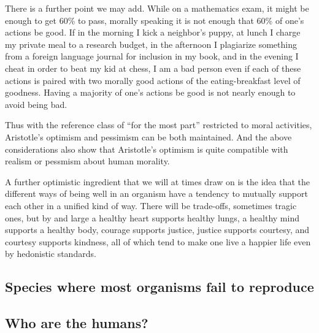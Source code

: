 There is a further point we may add. While on a mathematics exam, it might be enough to get 60\% to pass,
morally speaking it is not enough that 60\% of one's actions be good. If in the morning I kick a neighbor's puppy,
at lunch I charge my private meal to a research budget, in the afternoon I plagiarize something from a foreign
language journal for inclusion in my book, and in the evening I cheat in order to beat my kid at chess, I am a bad
person even if each of these actions is paired with two morally good actions of the eating-breakfast level of 
goodness. Having a majority of one's actions be good is not nearly enough to avoid being bad. 

Thus with the reference class of ``for the most part'' restricted to moral activities, Aristotle's optimism and pessimism
can be both maintained. And the above considerations also show that Aristotle's optimism is quite compatible with 
realism or pessmism about human morality.

A further optimistic ingredient that we will at times draw on is the idea that the different ways of being
well in an organism have a tendency to mutually support each other in a unified kind of way. There will be
trade-offs, sometimes tragic ones, but by and large a healthy heart supports healthy lungs, a healthy mind supports a healthy body,
courage supports justice, justice supports courtesy, and courtesy supports kindness, all of which tend to make
one live a happier life even by hedonistic standards. 

\subsection{Species where most organisms fail to reproduce}

\subsection{Who are the humans?}
